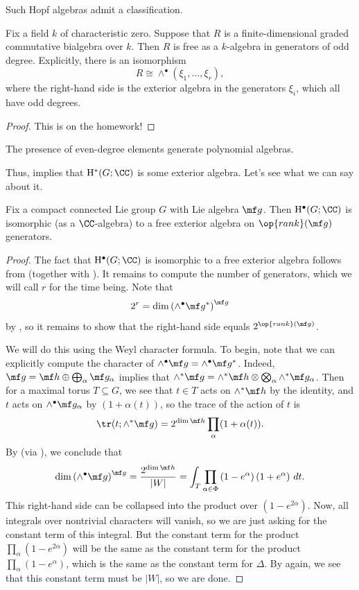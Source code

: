 \documentclass[../notes.tex]{subfiles}
\begin{document}
Such Hopf algebras admit a classification.
\begin{theorem}[Hopf] \label{thm:hopf}
	Fix a field $k$ of characteristic zero. Suppose that $R$ is a finite-dimensional graded commutative bialgebra over $k$. Then $R$ is free as a $k$-algebra in generators of odd degree. Explicitly, there is an isomorphism
	\[R\cong\land^\bullet(\xi_1,\ldots,\xi_r),\]
	where the right-hand side is the exterior algebra in the generators $\xi_i$, which all have odd degrees.
\end{theorem}
\begin{proof}
	This is on the homework!
\end{proof}
\begin{remark}
	The presence of even-degree elements generate polynomial algebras.
\end{remark}
Thus,  implies that $\mathrm H^*(G;\CC)$ is some exterior algebra. Let's see what we can say about it.
\begin{proposition} \label{prop:number-of-gens-cohomology}
	Fix a compact connected Lie group $G$ with Lie algebra $\mf g$. Then $\mathrm H^\bullet(G;\CC)$ is isomorphic (as a $\CC$-algebra) to a free exterior algebra on $\op{rank}(\mf g)$ generators.
\end{proposition}
\begin{proof}
	The fact that $\mathrm H^\bullet(G;\CC)$ is isomorphic to a free exterior algebra follows from  (together with ). It remains to compute the number of generators, which we will call $r$ for the time being. Note that
	\[2^r=\dim\left(\land^\bullet\mf g^*\right)^{\mf g}\]
	by , so it remains to show that the right-hand side equals $2^{\op{rank}(\mf g)}$.

	We will do this using the Weyl character formula. To begin, note that we can explicitly compute the character of $\land^\bullet\mf g=\land^\bullet\mf g^*$. Indeed, $\mf g=\mf h\oplus\bigoplus_\alpha\mf g_\alpha$ implies that $\land^*\mf g=\land^*\mf h\otimes\bigotimes_\alpha\land^*\mf g_\alpha$. Then for a maximal torus $T\subseteq G$, we see that $t\in T$ acts on $\land^*\mf h$ by the identity, and $t$ acts on $\land^\bullet\mf g_\alpha$ by $(1+\alpha(t))$, so the trace of the action of $t$ is
	\[\tr(t;\land^*\mf g)=2^{\dim\mf h}\prod_\alpha(1+\alpha(t)).\]
	By  (via ), we conclude that
	\[\dim\left(\land^\bullet\mf g\right)^{\mf g}=\frac{2^{\dim\mf h}}{\left|W\right|}=\int_T\prod_{\alpha\in\Phi}\left(1-e^\alpha\right)\left(1+e^\alpha\right)\,dt.\]
	This right-hand side can be collapsed into the product over $\left(1-e^{2\alpha}\right)$. Now, all integrals over nontrivial characters will vanish, so we are just asking for the constant term of this integral. But the constant term for the product $\prod_\alpha\left(1-e^{2\alpha}\right)$ will be the same as the constant term for the product $\prod_\alpha\left(1-e^\alpha\right)$, which is the same as the constant term for $\Delta$. By  again, we see that this constant term must be $\left|W\right|$, so we are done.
\end{proof}
\end{document}
